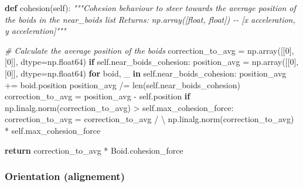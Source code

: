 \documentclass[
]{article}
\newenvironment{Shaded}{}{}
\newcommand{\BuiltInTok}[1]{#1}
\newcommand{\CommentTok}[1]{\textcolor[rgb]{0.38,0.63,0.69}{\textit{#1}}}
\newcommand{\ControlFlowTok}[1]{\textcolor[rgb]{0.00,0.44,0.13}{\textbf{#1}}}
\newcommand{\DecValTok}[1]{\textcolor[rgb]{0.25,0.63,0.44}{#1}}
\newcommand{\KeywordTok}[1]{\textcolor[rgb]{0.00,0.44,0.13}{\textbf{#1}}}
\newcommand{\NormalTok}[1]{#1}
\newcommand{\OperatorTok}[1]{\textcolor[rgb]{0.40,0.40,0.40}{#1}}
\newcommand{\VariableTok}[1]{\textcolor[rgb]{0.10,0.09,0.49}{#1}}
\begin{document}
\begin{Shaded}
\begin{Highlighting}[]
\KeywordTok{def}\NormalTok{ cohesion(}\VariableTok{self}\NormalTok{):}
    \CommentTok{"""Cohesion behaviour to steer towards the average position of the boids in the near\_boids list}
\CommentTok{    Returns:}
\CommentTok{        np.array([float, float]) {-}{-} [x acceleration, y acceleration]"""}

    \CommentTok{\# Calculate the average position of the boids}
\NormalTok{    correction\_to\_avg }\OperatorTok{=}\NormalTok{ np.array([[}\DecValTok{0}\NormalTok{], [}\DecValTok{0}\NormalTok{]], dtype}\OperatorTok{=}\NormalTok{np.float64)}
    \ControlFlowTok{if} \VariableTok{self}\NormalTok{.near\_boids\_cohesion:}
\NormalTok{        position\_avg }\OperatorTok{=}\NormalTok{ np.array([[}\DecValTok{0}\NormalTok{], [}\DecValTok{0}\NormalTok{]], dtype}\OperatorTok{=}\NormalTok{np.float64)}
        \ControlFlowTok{for}\NormalTok{ boid, \_ }\KeywordTok{in} \VariableTok{self}\NormalTok{.near\_boids\_cohesion:}
\NormalTok{            position\_avg }\OperatorTok{+=}\NormalTok{ boid.position}
\NormalTok{        position\_avg }\OperatorTok{/=} \BuiltInTok{len}\NormalTok{(}\VariableTok{self}\NormalTok{.near\_boids\_cohesion)}
\NormalTok{        correction\_to\_avg }\OperatorTok{=}\NormalTok{ position\_avg }\OperatorTok{{-}} \VariableTok{self}\NormalTok{.position}
    \ControlFlowTok{if}\NormalTok{ np.linalg.norm(correction\_to\_avg) }\OperatorTok{\textgreater{}} \VariableTok{self}\NormalTok{.max\_cohesion\_force:}
\NormalTok{        correction\_to\_avg }\OperatorTok{=}\NormalTok{ correction\_to\_avg }\OperatorTok{/} \OperatorTok{\textbackslash{}}
\NormalTok{            np.linalg.norm(correction\_to\_avg) }\OperatorTok{*} \VariableTok{self}\NormalTok{.max\_cohesion\_force}

    \ControlFlowTok{return}\NormalTok{ correction\_to\_avg }\OperatorTok{*}\NormalTok{ Boid.cohesion\_force}
\end{Highlighting}
\end{Shaded}

\hypertarget{orientation-alignement}{%
\subsubsection{Orientation (alignement)}\label{orientation-alignement}}
\end{document}
